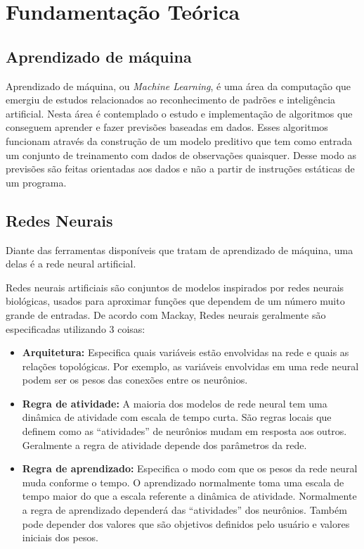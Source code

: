 \chapter{Fundamentação Teórica}

\section{Aprendizado de máquina}

Aprendizado de máquina, ou \textit{Machine Learning}, é uma área da
computação que emergiu de estudos relacionados ao reconhecimento de
padrões e inteligência artificial. Nesta área é contemplado o estudo e
implementação de algoritmos que conseguem aprender e fazer previsões
baseadas em dados. Esses algoritmos funcionam através da construção de
um modelo preditivo que tem como entrada um conjunto de treinamento
com dados de observações quaisquer. Desse modo as previsões são feitas
orientadas aos dados e não a partir de instruções estáticas de um
programa.

\section{Redes Neurais}

Diante das ferramentas disponíveis que tratam de aprendizado de
máquina, uma delas é a rede neural artificial.

Redes neurais artificiais são conjuntos de modelos inspirados por
redes neurais biológicas, usados para aproximar funções que dependem
de um número muito grande de entradas. De acordo com Mackay\cite{Mackay},
Redes neurais geralmente são especificadas utilizando 3 coisas:

\begin{itemize}

\item {\bf Arquitetura:} Especifica quais variáveis estão envolvidas
  na rede e quais as relações topológicas. Por exemplo, as variáveis
  envolvidas em uma rede neural podem ser os pesos das conexões entre
  os neurônios.

\item {\bf Regra de atividade:} A maioria dos modelos de rede neural
  tem uma dinâmica de atividade com escala de tempo curta. São regras
  locais que definem como as ``atividades'' de neurônios mudam em
  resposta aos outros. Geralmente a regra de atividade depende dos
  parâmetros da rede.

\item {\bf Regra de aprendizado:} Especifica o modo com que os pesos
  da rede neural muda conforme o tempo. O aprendizado normalmente toma
  uma escala de tempo maior do que a escala referente a dinâmica de
  atividade. Normalmente a regra de aprendizado dependerá das
  ``atividades'' dos neurônios. Também pode depender dos valores
  que são objetivos definidos pelo usuário e valores iniciais dos
  pesos.

\end{itemize}

